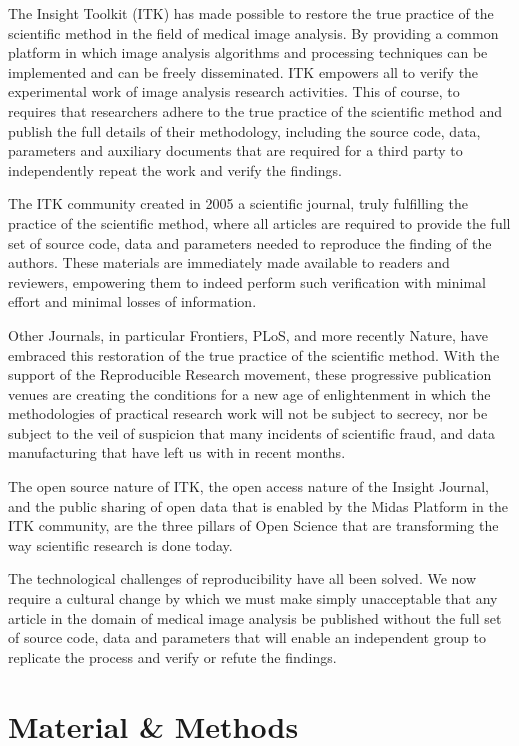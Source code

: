 \documentclass{frontiersENG} %
\begin{document}
The Insight Toolkit (ITK) has made possible to restore the true practice of the
scientific method in the field of medical image analysis. By providing a common
platform in which image analysis algorithms and processing techniques can be
implemented and can be freely disseminated. ITK empowers all to verify the
experimental work of image analysis research activities. This of course, to
requires that researchers adhere to the true practice of the scientific method
and publish the full details of their methodology, including the source code,
data, parameters and auxiliary documents that are required for a third party to
independently repeat the work and verify the findings.

The ITK community created in 2005 a scientific journal, truly fulfilling the
practice of the scientific method, where all articles are required to provide
the full set of source code, data and parameters needed to reproduce the
finding of the authors. These materials are immediately made available to
readers and reviewers, empowering them to indeed perform such verification with
minimal effort and minimal losses of information.

Other Journals, in particular Frontiers, PLoS, and more recently Nature, have
embraced this restoration of the true practice of the scientific method.  With
the support of the Reproducible Research movement, these progressive
publication venues are creating the conditions for a new age of enlightenment
in which the methodologies of practical research work will not be subject to
secrecy, nor be subject to the veil of suspicion that many incidents of
scientific fraud, and data manufacturing that have left us with in recent
months.

The open source nature of ITK, the open access nature of the Insight Journal,
and the public sharing of open data that is enabled by the Midas Platform in
the ITK community, are the three pillars of Open Science that are transforming
the way scientific research is done today.

The technological challenges of reproducibility have all been solved. We now
require a cultural change by which we must make simply unacceptable that any
article in the domain of medical image analysis be published without the full
set of source code, data and parameters that will enable an independent group
to replicate the process and verify or refute the findings.




\section{Material \& Methods}
\end{document}
